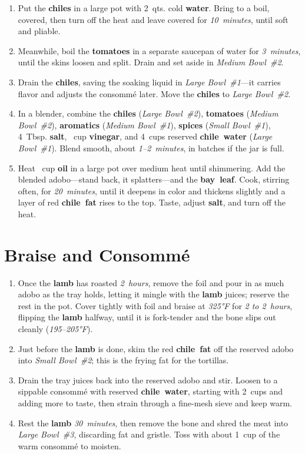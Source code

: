 \documentclass[11pt,letterpaper]{article}
\begin{document}
\begin{enumerate}
    \item Put the \textbf{chiles} in a large pot with 2~qts. cold \textbf{water}. Bring to a boil, covered, then turn off the heat and leave covered for \textit{10~minutes}, until soft and pliable.
    \item Meanwhile, boil the \textbf{tomatoes} in a separate saucepan of water for \textit{3~minutes}, until the skins loosen and split. Drain and set aside in \textit{Medium Bowl~\#2}.
    \item Drain the \textbf{chiles}, saving the soaking liquid in \textit{Large Bowl~\#1}---it carries flavor and adjusts the consommé later. Move the \textbf{chiles} to \textit{Large Bowl~\#2}.
    \item In a blender, combine the \textbf{chiles} (\textit{Large Bowl~\#2}), \textbf{tomatoes} (\textit{Medium Bowl~\#2}), \textbf{aromatics} (\textit{Medium Bowl~\#1}), \textbf{spices} (\textit{Small Bowl~\#1}), 4~Tbsp. \textbf{salt}, ~cup \textbf{vinegar}, and 4~cups reserved \textbf{chile~water} (\textit{Large Bowl~\#1}). Blend smooth, about \textit{1--2~minutes}, in batches if the jar is full.
    \item Heat ~cup \textbf{oil} in a large pot over medium heat until shimmering. Add the blended adobo---stand back, it splatters---and the \textbf{bay~leaf}. Cook, stirring often, for \textit{20~minutes}, until it deepens in color and thickens slightly and a layer of red \textbf{chile~fat} rises to the top. Taste, adjust \textbf{salt}, and turn off the heat.
\end{enumerate}

\filbreak
\section*{Braise and Consommé}

\begin{enumerate}
    \item Once the \textbf{lamb} has roasted \textit{2~hours}, remove the foil and pour in as much adobo as the tray holds, letting it mingle with the \textbf{lamb} juices; reserve the rest in the pot. Cover tightly with foil and braise at \textit{325°F} for \textit{2 to 2~hours}, flipping the \textbf{lamb} halfway, until it is fork-tender and the bone slips out cleanly (\textit{195--205°F}).
    \item Just before the \textbf{lamb} is done, skim the red \textbf{chile~fat} off the reserved adobo into \textit{Small Bowl~\#2}; this is the frying fat for the tortillas.
    \item Drain the tray juices back into the reserved adobo and stir. Loosen to a sippable consommé with reserved \textbf{chile~water}, starting with 2~cups and adding more to taste, then strain through a fine-mesh sieve and keep warm.
    \item Rest the \textbf{lamb} \textit{30~minutes}, then remove the bone and shred the meat into \textit{Large Bowl~\#3}, discarding fat and gristle. Toss with about 1~cup of the warm consommé to moisten.
\end{enumerate}
\end{document}
